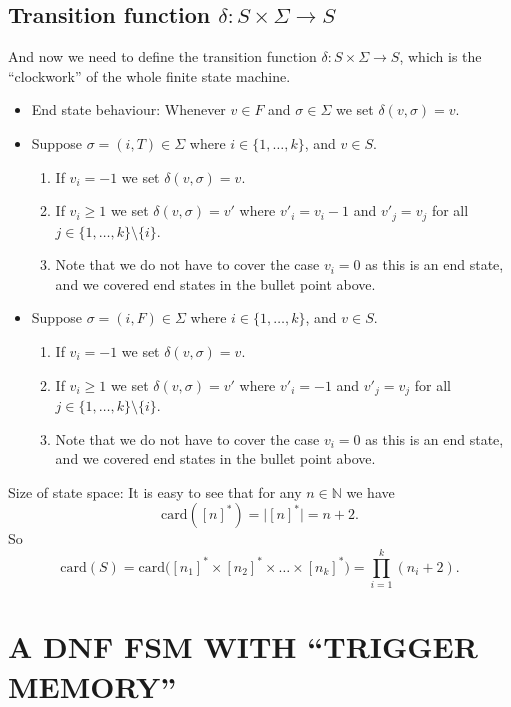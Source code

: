 \documentclass[12pt]{amsart}
\begin{document}
\subsection{Transition function $\delta: S\times \Sigma \to S$}
And now we need to define the transition function $\delta: S \times \Sigma
\to S$, which is the ``clockwork'' of the whole finite state machine.
\begin{itemize}
    \item End state behaviour: Whenever $v\in F$ and $\sigma \in \Sigma$ 
    we set $\delta(v, \sigma) = v$.
    \item Suppose $\sigma = (i, T) \in \Sigma$ where $i\in\{1,\ldots,k\}$, 
    and $v\in S$.
    \begin{enumerate}
        \item If $v_i = -1$ we set $\delta(v, \sigma) = v$.
        \item If $v_i \geq 1$ we set $\delta(v,\sigma) = v'$ where $v'_i = v_i -1$ 
        and $v'_j = v_j$ for all $j\in \{1,\ldots,k\}\setminus\{i\}$. 
        \item Note that we do not have to cover the case $v_i = 0$ as this 
        is an end state, and we covered end states in the bullet point above. 
    \end{enumerate}
    \item Suppose $\sigma = (i, F) \in \Sigma$ where $i\in\{1,\ldots,k\}$, 
    and $v\in S$.
    \begin{enumerate}
        \item If $v_i = -1$ we set $\delta(v, \sigma) = v$.
        \item If $v_i \geq 1$ we set $\delta(v,\sigma) = v'$ where $v'_i = -1$ 
        and $v'_j = v_j$ for all $j\in \{1,\ldots,k\}\setminus\{i\}$. 
        \item Note that we do not have to cover the case $v_i = 0$ as this 
        is an end state, and we covered end states in the bullet point above. 
    \end{enumerate}
\end{itemize}
Size of state space: It is easy to see that for any $n\in\mathbb{N}$ we 
have $$\text{card}([n]^*) = \big|[n]^*\big| = n+2.$$
So $$\text{card}(S) = \text{card}\big([n_1]^* \times [n_2]^* 
\times \ldots \times [n_k]^* \big) =
\prod_{i=1}^k (n_i+2).$$

\section{A DNF FSM WITH ``TRIGGER MEMORY''}
\end{document}
